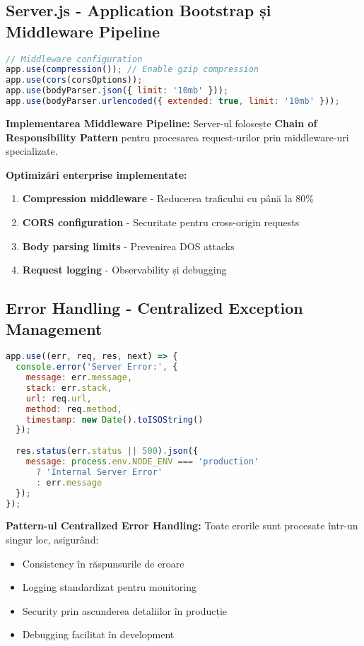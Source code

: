 \documentclass[11pt,a4paper]{article}
\begin{document}
\subsection{Server.js - Application Bootstrap și Middleware Pipeline}

\begin{lstlisting}[language=JavaScript, caption=Middleware Pipeline Configuration]
// Middleware configuration
app.use(compression()); // Enable gzip compression
app.use(cors(corsOptions));
app.use(bodyParser.json({ limit: '10mb' }));
app.use(bodyParser.urlencoded({ extended: true, limit: '10mb' }));
\end{lstlisting}

\textbf{Implementarea Middleware Pipeline:} Server-ul folosește \textbf{Chain of Responsibility Pattern} pentru procesarea request-urilor prin middleware-uri specializate.

\textbf{Optimizări enterprise implementate:}
\begin{enumerate}
    \item \textbf{Compression middleware} - Reducerea traficului cu până la 80\%
    \item \textbf{CORS configuration} - Securitate pentru cross-origin requests
    \item \textbf{Body parsing limits} - Prevenirea DOS attacks
    \item \textbf{Request logging} - Observability și debugging
\end{enumerate}

\subsection{Error Handling - Centralized Exception Management}

\begin{lstlisting}[language=JavaScript, caption=Global Error Handler]
app.use((err, req, res, next) => {
  console.error('Server Error:', {
    message: err.message,
    stack: err.stack,
    url: req.url,
    method: req.method,
    timestamp: new Date().toISOString()
  });
  
  res.status(err.status || 500).json({ 
    message: process.env.NODE_ENV === 'production' 
      ? 'Internal Server Error' 
      : err.message
  });
});
\end{lstlisting}

\textbf{Pattern-ul Centralized Error Handling:} Toate erorile sunt procesate într-un singur loc, asigurând:
\begin{itemize}
    \item Consistency în răspunsurile de eroare
    \item Logging standardizat pentru monitoring
    \item Security prin ascunderea detaliilor în producție
    \item Debugging facilitat în development
\end{itemize}
\end{document}
